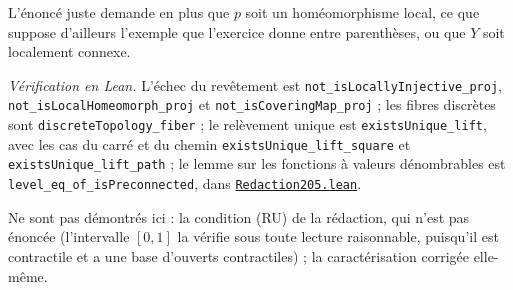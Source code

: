 \noindent L'énoncé juste demande en plus que $p$ soit un homéomorphisme local, ce que suppose d'ailleurs l'exemple que l'exercice donne entre parenthèses, ou que $Y$ soit localement connexe.

\begin{sloppypar}
\noindent\emph{Vérification en Lean.} L'échec du revêtement est \texttt{not\_isLocallyInjective\_proj}, \texttt{not\_isLocalHomeomorph\_proj} et \texttt{not\_isCoveringMap\_proj} ; les fibres discrètes sont \texttt{discreteTopology\_fiber} ; le relèvement unique est \texttt{existsUnique\_lift}, avec les cas du carré et du chemin \texttt{existsUnique\_lift\_square} et \texttt{existsUnique\_lift\_path} ; le lemme sur les fonctions à valeurs dénombrables est \texttt{level\_eq\_of\_isPreconnected}, dans \href{\leanblobmain/Redaction205.lean}{\texttt{Redaction205.\allowbreak{}lean}}.
\end{sloppypar}

Ne sont pas démontrés ici : la condition (RU) de la rédaction, qui n'est pas énoncée (l'intervalle $[0, 1]$ la vérifie sous toute lecture raisonnable, puisqu'il est contractile et a une base d'ouverts contractiles) ; la caractérisation corrigée elle-même.

